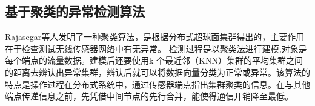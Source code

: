 





\subsection{基于聚类的异常检测算法}



Rajasegar等人\cite{2014Hyperspherical}发明了一种聚类算法，是根据分布式超球面集群得出的，主要作用在于检查测试无线传感器网络中有无异常。
检测过程是以聚类法进行建模,对象是每个端点的流量数据。建模后还要使用k 个最近邻（KNN）集群的平均集群之间的距离去辨认出异常集群，辨认后就可以将数据向量分类为正常或异常。该算法的特点是操作过程在分布式系统中，通过传感器端点指出集群聚类的信息。在与其他端点传递信息之前，先凭借中间节点的先行合并，能使得通信开销降至最低。


